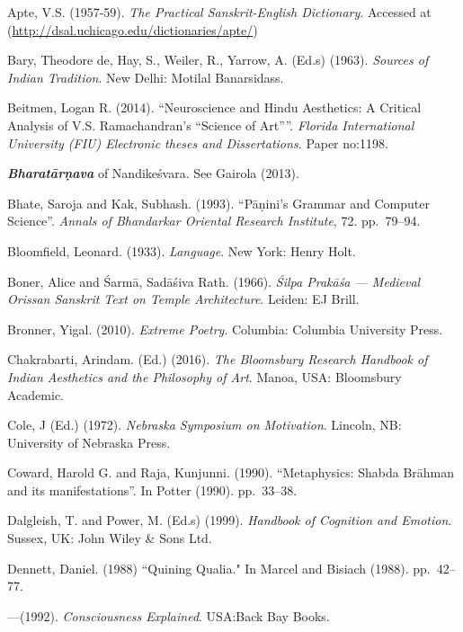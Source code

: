 \begin{thebibliography}{99}
\itemsep=2pt
Apte, V.S. (1957-59). \textsl{The Practical Sanskrit-English Dictionary}.  Accessed at (\url{http://dsal.uchicago.edu/dictionaries/apte/})

Bary, Theodore de, Hay, S., Weiler, R., Yarrow, A. (Ed.s) (1963). \textsl{Sources of Indian Tradition}. New Delhi: Motilal Banarsidass.

Beitmen, Logan R. (2014). ``Neuroscience and Hindu Aesthetics: A Critical Analysis of V.S. Ramachandran's ``Science of Art''''. \textsl{Florida International University (FIU) Electronic theses and Dissertations.} Paper no:1198.

{\sl\bfseries Bharatārṇava} of Nandikeśvara. See Gairola (2013).

Bhate, Saroja and Kak, Subhash. (1993). “Pāṇini’s Grammar and Computer Science”. \textsl{Annals of Bhandarkar Oriental Research Institute}, 72. pp.~79--94.

Bloomfield, Leonard. (1933). \textsl{Language}. New York: Henry Holt.

Boner, Alice and Śarmā, Sadāśiva Rath. (1966). \textsl{Śilpa Prakāśa --- Medieval Orissan Sanskrit Text on Temple Architecture}. Leiden: EJ Brill.

Bronner, Yigal. (2010). \textsl{Extreme Poetry}. Columbia: Columbia University Press.

Chakrabarti, Arindam. (Ed.) (2016). \textsl{The Bloomsbury Research Handbook of Indian Aesthetics and the Philosophy of Art}. Manoa, USA: Bloomsbury Academic.

Cole, J (Ed.) (1972). \textsl{Nebraska Symposium on Motivation}. Lincoln, NB: University of Nebraska Press.

Coward, Harold G. and Raja, Kunjunni. (1990). “Metaphysics: Shabda Brāhman and its manifestations”. In Potter (1990). pp.~33--38.

Dalgleish, T. and Power, M. (Ed.s) (1999). \textsl{Handbook of Cognition and Emotion}. Sussex, UK: John Wiley \& Sons Ltd.

Dennett, Daniel. (1988) ``Quining Qualia." In Marcel and Bisiach (1988). pp.~42--77.

---\kern3pt(1992). \textsl{Consciousness Explained}. USA:Back Bay Books.


\end{thebibliography}
